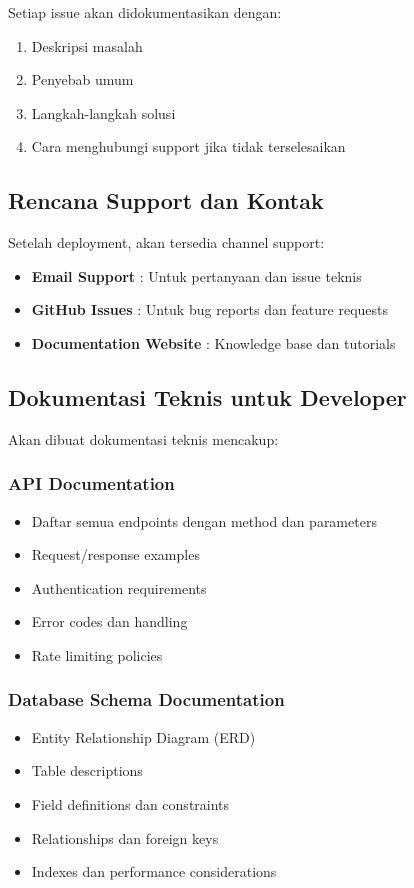 Setiap issue akan didokumentasikan dengan:
\begin{enumerate}[leftmargin=*]
    \item Deskripsi masalah
    \item Penyebab umum
    \item Langkah-langkah solusi
    \item Cara menghubungi support jika tidak terselesaikan
\end{enumerate}

\subsection{Rencana Support dan Kontak}

Setelah deployment, akan tersedia channel support:

\begin{itemize}[leftmargin=*]
    \item \textbf{Email Support} : Untuk pertanyaan dan issue teknis
    \item \textbf{GitHub Issues} : Untuk bug reports dan feature requests
    \item \textbf{Documentation Website} : Knowledge base dan tutorials
\end{itemize}

\subsection{Dokumentasi Teknis untuk Developer}

Akan dibuat dokumentasi teknis mencakup:

\subsubsection{API Documentation}
\begin{itemize}[leftmargin=*]
    \item Daftar semua endpoints dengan method dan parameters
    \item Request/response examples
    \item Authentication requirements
    \item Error codes dan handling
    \item Rate limiting policies
\end{itemize}

\subsubsection{Database Schema Documentation}
\begin{itemize}[leftmargin=*]
    \item Entity Relationship Diagram (ERD)
    \item Table descriptions
    \item Field definitions dan constraints
    \item Relationships dan foreign keys
    \item Indexes dan performance considerations
\end{itemize}

